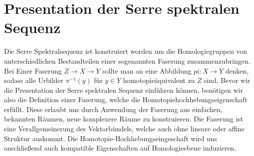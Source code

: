 \documentclass[12pt, hidelinks]{article}
\numberwithin{conj}{section}
\begin{document}
\section{Presentation der Serre spektralen Sequenz}
Die Serre Spektralsequenz ist konstruiert worden um die Homologiegruppen von unterschiedlichen Bestandteilen einer sogenannten Faserung zusammenzubringen. Bei Einer Faserung $Z \to X \to Y$ sollte man an eine Abbildung $pi: X \to Y$ denken, sodass alle Urbilder $\pi^{-1}(y)$ für $y \in Y$ homotopieäquivalent zu $Z$ sind. Bevor wir die Presentation der Serre spektralen Sequenz einführen können, benötigen wir also die Definition einer Faserung, welche die Homotopiehochhebungseigenschaft erfüllt. Diese erlaubt uns durch Anwendung der Faserung aus einfachen, bekannten Räumen, neue komplexere Räume zu konstruieren. Die Faserung ist eine Verallgemeinerung des Vektorbündels, welche auch ohne lineare oder affine Struktur auskommt. Die Homotopie-Hochhebungseingeschaft wird uns anschließend auch kompatible Eigenschaften auf Homologieebene induzieren.
\end{document}
